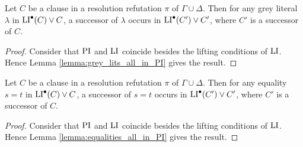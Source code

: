 \documentclass[%
	draft=false,%
	numbers=noendperiod,%
	11pt,%
	a4paper,%
	oneside,%
	openany,%
]{memoir}
\begin{document}
\begin{clemma}
	\label{lemma:grey_lits_all_in_LI}
	Let $C$ be a clause in a resolution refutation $\pi$ of $\Gamma \cup \Delta$.
	Then for any grey literal $\lambda$ in $\operatorname{LI}^\bullet(C) \lor C$, a successor of $\lambda$ occurs in $\operatorname{LI}^\bullet(C') \lor C'$, where $C'$ is a successor of $C$.
\end{clemma}
\begin{proof}
	Consider that $\operatorname{PI}$ and $\operatorname{LI}$ coincide besides the lifting conditions of $\operatorname{LI}$. Hence Lemma \ref{lemma:grey_lits_all_in_PI} gives the result.
\end{proof}

\begin{clemma}
	\label{lemma:equalities_all_in_LI}
	Let $C$ be a clause in a resolution refutation $\pi$ of $\Gamma \cup \Delta$.
	Then for any equality $s=t$ in $\operatorname{LI}^\bullet(C) \lor C$, a successor of $s=t$ occurs in $\operatorname{LI}^\bullet(C') \lor C'$, where $C'$ is a successor of $C$.
\end{clemma}
\begin{proof}
	Consider that $\operatorname{PI}$ and $\operatorname{LI}$ coincide besides the lifting conditions of $\operatorname{LI}$. Hence Lemma \ref{lemma:equalities_all_in_PI} gives the result.
\end{proof}
\end{document}

